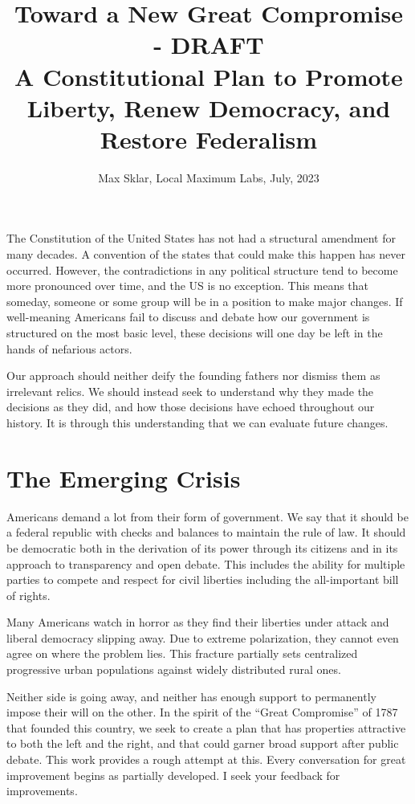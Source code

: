 \documentclass{article}
\begin{document}
\parindent=0in
\parskip=12pt

\title{
  Toward a New Great Compromise - DRAFT \\
  \large{
    A Constitutional Plan to Promote Liberty, Renew Democracy, and Restore Federalism
  }
}

\author{Max Sklar, Local Maximum Labs, July, 2023}
\date{}

\maketitle

The Constitution of the United States has not had a structural amendment for many decades. A convention of the states that could make this happen has never occurred. However, the contradictions in any political structure tend to become more pronounced over time, and the US is no exception. This means that someday, someone or some group will be in a position to make major changes. If well-meaning Americans fail to discuss and debate how our government is structured on the most basic level, these decisions will one day be left in the hands  of nefarious actors.

Our approach should neither deify the founding fathers nor dismiss them as irrelevant relics. We should instead seek to understand why they made the decisions as they did, and how those decisions have echoed throughout our history. It is through this understanding that we can evaluate future changes.

\section{The Emerging Crisis}

Americans demand a lot from their form of government. We say that it should be a federal republic with checks and balances to maintain the rule of law. It should be democratic both in the derivation of its power through its citizens and in its approach to transparency and open debate. This includes the ability for multiple parties to compete and respect for civil liberties including the all-important bill of rights.

Many Americans watch in horror as they find their liberties under attack and liberal democracy slipping away. Due to extreme polarization, they cannot even agree on where the problem lies. This fracture partially sets centralized progressive urban populations against widely distributed rural ones. 

Neither side is going away, and neither has enough support to permanently impose their will on the other. In the spirit of the “Great Compromise” of 1787 that founded this country, we seek to create a plan that has properties attractive to both the left and the right, and that could garner broad support after public debate. This work provides a rough attempt at this. Every conversation for great improvement begins as partially developed. I seek your feedback for improvements.
\end{document}
